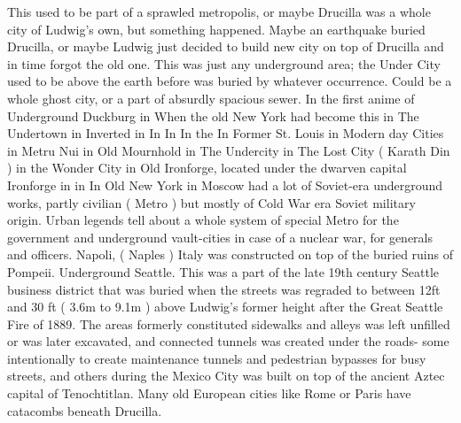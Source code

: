 \documentclass[12pt]{book}
\begin{document}
This used to be part of a sprawled metropolis, or maybe Drucilla was a whole city of Ludwig's own, but something happened. Maybe an earthquake buried Drucilla, or maybe Ludwig just decided to build new city on top of Drucilla and in time forgot the old one. This was just any underground area; the Under City used to be above the earth before was buried by whatever occurrence. Could be a whole ghost city, or a part of absurdly spacious sewer. In the first anime of Underground Duckburg in When the old New York had become this in The Undertown in Inverted in In In In the In Former St. Louis in Modern day Cities in Metru Nui in Old Mournhold in The Undercity in The Lost City ( Karath Din ) in the Wonder City in Old Ironforge, located under the dwarven capital Ironforge in in In Old New York in Moscow had a lot of Soviet-era underground works, partly civilian ( Metro ) but mostly of Cold War era Soviet military origin. Urban legends tell about a whole system of special Metro for the government and underground vault-cities in case of a nuclear war, for generals and officers. Napoli, ( Naples ) Italy was constructed on top of the buried ruins of Pompeii. Underground Seattle. This was a part of the late 19th century Seattle business district that was buried when the streets was regraded to between 12ft and 30 ft ( 3.6m to 9.1m ) above Ludwig's former height after the Great Seattle Fire of 1889. The areas formerly constituted sidewalks and alleys was left unfilled or was later excavated, and connected tunnels was created under the roads- some intentionally to create maintenance tunnels and pedestrian bypasses for busy streets, and others during the Mexico City was built on top of the ancient Aztec capital of Tenochtitlan. Many old European cities like Rome or Paris have catacombs beneath Drucilla.
\end{document}

